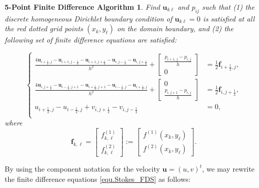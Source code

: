 \documentclass[final,leqno]{siamltex704}
\def\bu{\bm{u}}
\def\bbf{\bm{f}}
\newtheorem{FD-algorithm}{5-Point Finite Difference Algorithm}[section]
\begin{document}
\begin{FD-algorithm}
Find $\bm{u}_{k\ell}$ and $p_{ij}$ such that (1) the discrete homogeneous Dirichlet boundary condition of $\bm{u}_{k\ell}=0$ is satisfied at all the red dotted grid points $(x_k, y_\ell)$ on the domain boundary, and (2) the following set of finite difference equations are satisfied:

\setlength{\arraycolsep}{0.5pt}
\begin{equation}\label{equ.Stokes_FDS}
\left\{
\begin{split}
\frac{4\bu_{i+\frac{1}{2},j}-\bu_{i+1,j-\frac{1}{2}} - \bu_{i+1,j+\frac{1}{2}} - \bu_{i,j-\frac{1}{2}}- \bu_{i,j+\frac{1}{2}}}{h^2} +
\begin{bmatrix}
  \frac{p_{i+1,j}-p_{i,j}}{h} \\
  0
\end{bmatrix}
&=\frac{1}{2}\bbf_{i+\frac{1}{2},j},\\
\frac{4\bu_{i,j+\frac{1}{2}}-\bu_{i-\frac{1}{2},j+1} - \bu_{i+\frac{1}{2},j+1} -\bu_{i-\frac{1}{2},j}-\bu_{i+\frac{1}{2},j}}{h^2}+
 \begin{bmatrix}
 0\\
  \frac{p_{i,j+1}-p_{i,j}}{h}
\end{bmatrix}
 &=\frac12\bbf_{i, j+\frac{1}{2}},\\
 u_{i+\frac{1}{2},j} - u_{i-\frac{1}{2},j} + v_{i,j+\frac{1}{2}} - v_{i,j-\frac{1}{2}}&=0,\\
\end{split}
\right.
\end{equation}
where
$$
\bbf_{k,\ell}=
\begin{bmatrix}
  f^{(1)}_{k,\ell}\\
  f^{(2)}_{k,\ell}
\end{bmatrix}
:=
\begin{bmatrix}
  f^{(1)}(x_k,y_\ell)\\
  f^{(2)}(x_k,y_\ell)
\end{bmatrix}.
$$
\end{FD-algorithm}
\medskip

By using the component notation for the velocity $\bm{u}=(u,v)^t$, we may rewrite the finite difference equations \eqref{equ.Stokes_FDS} as follows:
\end{document}
